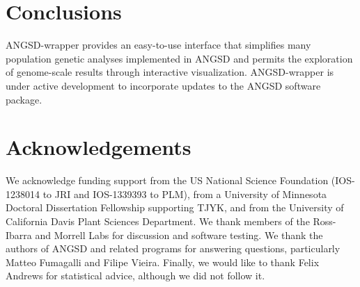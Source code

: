 \documentclass[10pt,a4paper]{article}
\begin{document}
\section*{Conclusions}
ANGSD-wrapper provides an easy-to-use interface that simplifies many population genetic analyses implemented in ANGSD \citep{korneliussen2014angsd} and permits the exploration of genome-scale results through interactive visualization.
ANGSD-wrapper is under active development to incorporate updates to the ANGSD software package.  

\section*{Acknowledgements}
We acknowledge funding support from the US National Science Foundation (IOS-1238014 to JRI and IOS-1339393 to PLM), from a University of Minnesota Doctoral Dissertation Fellowship supporting TJYK, and from the University of California Davis Plant Sciences Department. We thank members of the Ross-Ibarra and Morrell Labs for discussion and software testing. We thank the authors of ANGSD and related programs for answering questions, particularly Matteo Fumagalli and Filipe Vieira. Finally, we would like to thank Felix Andrews for statistical advice, although we did not follow it. 
\clearpage




\end{document}
